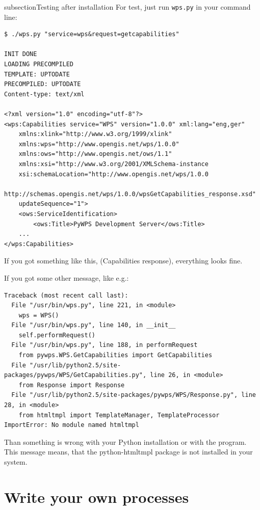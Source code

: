 \documentclass[a4paper,11pt]{article}
\begin{document}
subsection{Testing after installation}
\label{testing}
For test, just run
\texttt{wps.py} in your command line:
    
\begin{verbatim}
$ ./wps.py "service=wps&request=getcapabilities"

INIT DONE
LOADING PRECOMPILED
TEMPLATE: UPTODATE
PRECOMPILED: UPTODATE
Content-type: text/xml

<?xml version="1.0" encoding="utf-8"?>
<wps:Capabilities service="WPS" version="1.0.0" xml:lang="eng,ger"
    xmlns:xlink="http://www.w3.org/1999/xlink"
    xmlns:wps="http://www.opengis.net/wps/1.0.0"
    xmlns:ows="http://www.opengis.net/ows/1.1"
    xmlns:xsi="http://www.w3.org/2001/XMLSchema-instance
    xsi:schemaLocation="http://www.opengis.net/wps/1.0.0
    http://schemas.opengis.net/wps/1.0.0/wpsGetCapabilities_response.xsd"
    updateSequence="1">
	<ows:ServiceIdentification>
		<ows:Title>PyWPS Development Server</ows:Title>
    ...
</wps:Capabilities>
\end{verbatim}

If you got something like this, (Capabilities response), everything looks
fine.
     
If you got some other message, like e.g.:
     
\begin{verbatim}
Traceback (most recent call last):
  File "/usr/bin/wps.py", line 221, in <module>
    wps = WPS()
  File "/usr/bin/wps.py", line 140, in __init__
    self.performRequest()
  File "/usr/bin/wps.py", line 188, in performRequest
    from pywps.WPS.GetCapabilities import GetCapabilities
  File "/usr/lib/python2.5/site-packages/pywps/WPS/GetCapabilities.py", line 26, in <module>
    from Response import Response
  File "/usr/lib/python2.5/site-packages/pywps/WPS/Response.py", line 28, in <module>
    from htmltmpl import TemplateManager, TemplateProcessor
ImportError: No module named htmltmpl
\end{verbatim}

     
Than something is wrong with your Python installation or with the program.
This message means, that the python-htmltmpl package is not installed in
your system.
     
\section{Write your own processes}
\label{processes}
    
\end{document}
